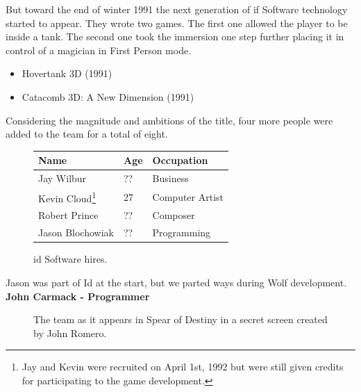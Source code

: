 \documentclass[book.tex]{subfiles}
\begin{document}
But toward the end of winter 1991 the next generation of if Software technology started to appear. They wrote two games. The first one allowed the player to be inside a tank. The second one took the immersion one step further placing it in control of a magician in First Person mode.
\begin{itemize}
  \item Hovertank 3D (1991)
  \item Catacomb 3D: A New Dimension (1991)
\end{itemize}


Considering the magnitude and ambitions of the title, four more people were added to the team for a total of eight.\\
 \begin{figure}[H]
\centering  
\begin{tabularx}{\textwidth}{ X  X  X  }
  \toprule
  \textbf{Name} &  \textbf{Age} & \textbf{Occupation} \\
  \toprule 
   Jay Wilbur & ?? &  Business\\
   Kevin Cloud\footnote{Jay and Kevin were recruited on April 1st, 1992 but were still given credits for participating to the game development.} & 27 &  Computer Artist\\
   Robert Prince & ?? &  Composer\\
   Jason Blochowiak & ?? &   Programming\\
     \toprule
\end{tabularx}
\caption{id Software hires.}\label{fig:Id Software hires}
\end{figure}

\begin{fancyquotes}
Jason was part of Id at the start, but we parted ways during Wolf development.
 \bigskip \\
\textbf{John Carmack - Programmer}
 \end{fancyquotes}
 
\begin{figure}[H]
\centering
\caption{The team as it appears in Spear of Destiny in a secret screen created by John Romero.}
\label{fig:id_team_1993}
\end{figure}
 
\end{document}
